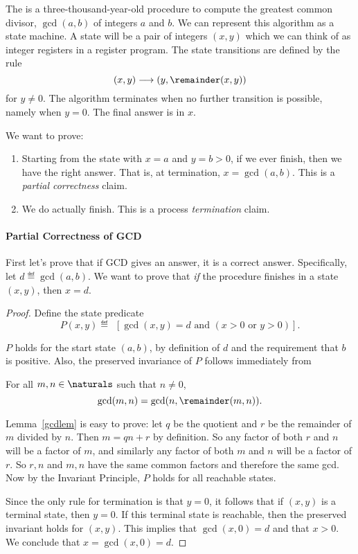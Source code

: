 \iffalse
The  is a
three-thousand-year-old procedure to compute the greatest common divisor,
$\gcd(a,b)$ of integers $a$ and $b$.  We can represent this algorithm as a
state machine.  A state will be a pair of integers $(x,y)$ which we can
think of as integer registers in a register program.  The state
transitions are defined by the rule
\[
(x,y) \movesto (y, \remainder(x,y))
\]
for $y \neq 0$.  The algorithm terminates when no further transition is
possible, namely when $y=0$.  The final answer is in $x$.

We want to prove:
\begin{enumerate}
\item Starting from the state with $x = a$ and $y = b>0$, if we ever finish,
then we have the right answer.  That is, at termination, $x = \gcd(a,b)$.
This is a \emph{partial correctness} claim.

\item We do actually finish.  This is a process \emph{termination} claim.

\end{enumerate}

\paragraph{Partial Correctness of GCD}

First let's prove that if GCD gives an answer, it is a correct answer.
Specifically, let $d \eqdef \gcd(a,b)$.  We want to prove that \emph{if}
the procedure finishes in a state $(x,y)$, then $x = d$.

\begin{proof}
Define the state predicate
\[
P(x,y) \eqdef\ \ [\gcd(x,y) = d \text{ and } (x > 0 \text{ or } y > 0)].
\]

$P$ holds for the start state $(a,b)$, by definition of $d$ and the
requirement that $b$ is positive.  Also, the preserved invariance of
$P$ follows immediately from
\begin{lemma}\label{gcdlem}
For all $m,n \in \naturals$ such that $n \neq 0$,
\begin{equation}
\gcd(m,n) = \gcd(n,\remainder(m,n)).
\end{equation}
\end{lemma}

Lemma~\ref{gcdlem} is easy to prove: let $q$ be the quotient and $r$
be the remainder of $m$ divided by $n$.  Then $m = qn +r$ by
definition.  So any factor of both $r$ and $n$ will be a factor of
$m$, and similarly any factor of both $m$ and $n$ will be a factor of
$r$.  So $r,n$ and $m,n$ have the same common factors and therefore
the same gcd.  Now by the Invariant Principle, $P$ holds for all
reachable states.

Since the only rule for termination is that $y=0$, it follows that if
$(x,y)$ is a terminal state, then $y=0$.  If this terminal state is
reachable, then the preserved invariant holds for $(x,y)$.  This implies
that $\gcd(x,0) = d$ and that $x>0$.  We conclude that $x = \gcd(x,0) =
d$.
\end{proof}

